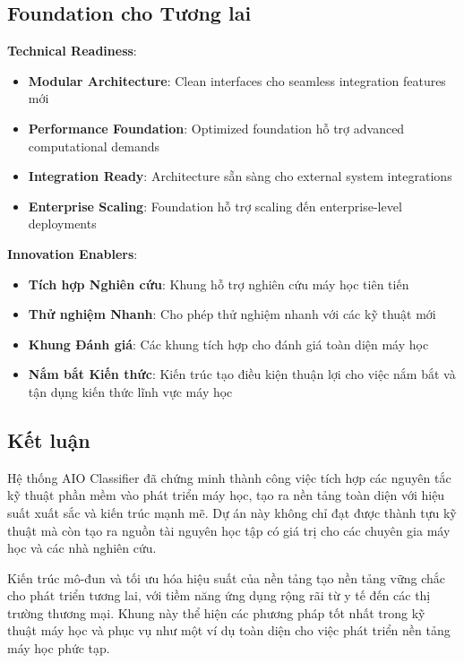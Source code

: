 \subsection{Foundation cho Tương lai}\label{subsec:future-foundation}

\textbf{Technical Readiness}:
\begin{itemize}
    \item \textbf{Modular Architecture}: Clean interfaces cho seamless integration features mới
    \item \textbf{Performance Foundation}: Optimized foundation hỗ trợ advanced computational demands
    \item \textbf{Integration Ready}: Architecture sẵn sàng cho external system integrations
    \item \textbf{Enterprise Scaling}: Foundation hỗ trợ scaling đến enterprise-level deployments
\end{itemize}

\textbf{Innovation Enablers}:
\begin{itemize}
    \item \textbf{Tích hợp Nghiên cứu}: Khung hỗ trợ nghiên cứu máy học tiên tiến
    \item \textbf{Thử nghiệm Nhanh}: Cho phép thử nghiệm nhanh với các kỹ thuật mới
    \item \textbf{Khung Đánh giá}: Các khung tích hợp cho đánh giá toàn diện máy học    \item \textbf{Nắm bắt Kiến thức}: Kiến trúc tạo điều kiện thuận lợi cho việc nắm bắt và tận dụng kiến thức lĩnh vực máy học
\end{itemize}

\subsection{Kết luận}

Hệ thống AIO Classifier đã chứng minh thành công việc tích hợp các nguyên tắc kỹ thuật phần mềm vào phát triển máy học, tạo ra nền tảng toàn diện với hiệu suất xuất sắc và kiến trúc mạnh mẽ. Dự án này không chỉ đạt được thành tựu kỹ thuật mà còn tạo ra nguồn tài nguyên học tập có giá trị cho các chuyên gia máy học và các nhà nghiên cứu.

Kiến trúc mô-đun và tối ưu hóa hiệu suất của nền tảng tạo nền tảng vững chắc cho phát triển tương lai, với tiềm năng ứng dụng rộng rãi từ y tế đến các thị trường thương mại. Khung này thể hiện các phương pháp tốt nhất trong kỹ thuật máy học và phục vụ như một ví dụ toàn diện cho việc phát triển nền tảng máy học phức tạp.